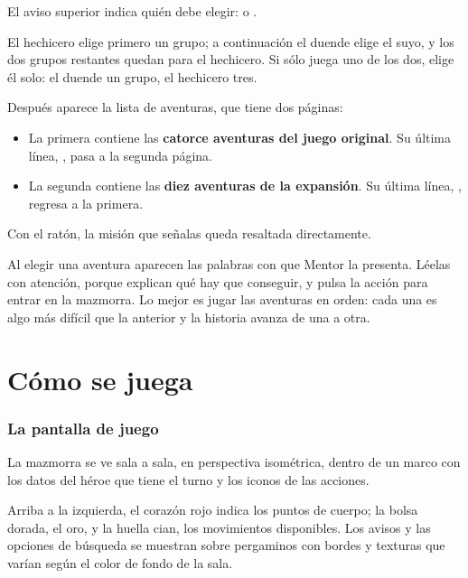 
El aviso superior indica quién debe elegir:  o .

El hechicero elige primero un grupo; a continuación el duende elige el
suyo, y los dos grupos restantes quedan para el hechicero. Si sólo juega
uno de los dos, elige él solo: el duende un grupo, el hechicero tres.

Después aparece la lista de aventuras, que tiene dos páginas:


\begin{itemize}
\item La primera contiene las \textbf{catorce aventuras del juego
  original}. Su última línea, , pasa a la segunda página.
\item La segunda contiene las \textbf{diez aventuras de la expansión}. Su
  última línea, , regresa a la primera.
\end{itemize}

Con el ratón, la misión que señalas queda resaltada directamente.

Al elegir una aventura aparecen las palabras con que Mentor la presenta.
Léelas con atención, porque explican qué hay que conseguir, y pulsa la
acción para entrar en la mazmorra. Lo mejor es jugar las aventuras en
orden: cada una es algo más difícil que la anterior y la historia avanza
de una a otra.


\chapter{Cómo se juega}


\subsection{La pantalla de juego}

La mazmorra se ve sala a sala, en perspectiva isométrica, dentro de un
marco con los datos del héroe que tiene el turno y los iconos de las
acciones.

Arriba a la izquierda, el corazón rojo indica los puntos de cuerpo; la
bolsa dorada, el oro, y la huella cian, los movimientos disponibles. Los
avisos y las opciones de búsqueda se muestran sobre pergaminos con bordes
y texturas que varían según el color de fondo de la sala.

